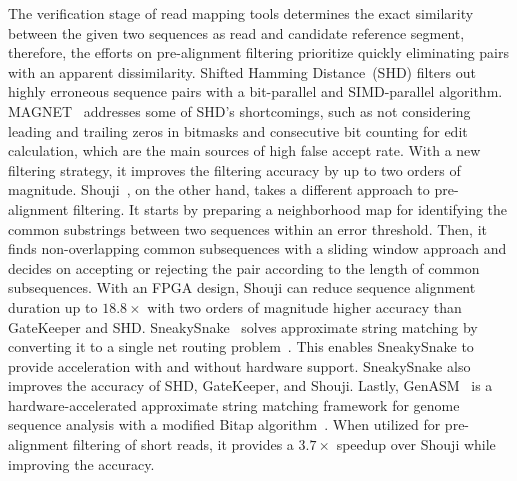The verification stage of read mapping tools determines the exact similarity between the given two sequences as read and candidate reference segment, therefore, the efforts on pre-alignment filtering prioritize quickly eliminating pairs with an apparent dissimilarity. Shifted Hamming Distance~(SHD)\cite{xin2015shifted} filters out highly erroneous sequence pairs with a bit-parallel and SIMD-parallel algorithm. MAGNET~\cite{alser2017magnet} addresses some of SHD's shortcomings, such as not considering leading and trailing zeros in bitmasks and consecutive bit counting for edit calculation, which are the main sources of high false accept rate. With a new filtering strategy, it improves the filtering accuracy by up to two orders of magnitude. Shouji~\cite{alser2019shouji}, on the other hand, takes a different approach to pre-alignment filtering. It starts by preparing a neighborhood map for identifying the common substrings between two sequences within an error threshold. Then, it finds non-overlapping common subsequences with a sliding window approach and decides on accepting or rejecting the pair according to the length of common subsequences. With an FPGA design, Shouji can reduce sequence alignment duration up to $18.8\times$ with two orders of magnitude higher accuracy than GateKeeper and SHD. SneakySnake~\cite{alser2020sneakysnake} solves approximate string matching by converting it to a single net routing problem~\cite{lee1976use}. This enables SneakySnake to provide acceleration with and without hardware support. SneakySnake also improves the accuracy of SHD, GateKeeper, and Shouji. Lastly, GenASM~\cite{cali2020genasm} is a hardware-accelerated approximate string matching framework for genome sequence analysis with a modified Bitap algorithm~\cite{baeza1992new, wu1992fast}. When utilized for pre-alignment filtering of short reads, it provides a $3.7\times$ speedup over Shouji while improving the accuracy.
